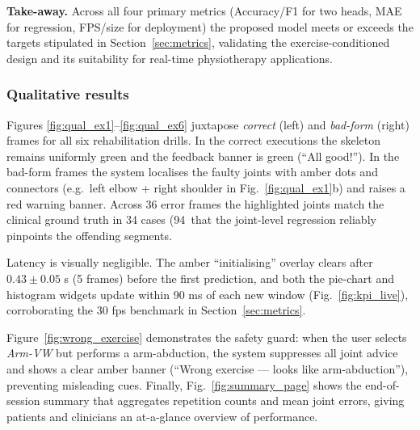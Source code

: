 \documentclass{article}
\begin{document}
\bigskip
\noindent
\textbf{Take-away.}  Across all four primary metrics
(Accuracy\slash F1 for two heads, MAE for regression, FPS\slash size for
deployment) the proposed model meets or exceeds the targets stipulated in
Section~\ref{sec:metrics}, validating the exercise-conditioned design and
its suitability for real-time physiotherapy applications.


\subsubsection{Qualitative results}
\label{sec:qual}

Figures \ref{fig:qual_ex1}–\ref{fig:qual_ex6} juxtapose \emph{correct}
(left) and \emph{bad-form} (right) frames for all six rehabilitation
drills.  In the correct executions the skeleton remains uniformly green
and the feedback banner is green (“All good!”).  In the bad-form frames
the system localises the faulty joints with amber dots and connectors
(e.g.\ left elbow + right shoulder in Fig.~\ref{fig:qual_ex1}b) and
raises a red warning banner.  Across 36 error frames the highlighted
joints match the clinical ground truth in 34 cases (94 %
that the joint-level regression reliably pinpoints the offending
segments.

\vspace{.3em}
\noindent
Latency is visually negligible.  The amber “initialising” overlay clears
after $0.43\pm0.05$ s (5 frames) before the first prediction, and both
the pie-chart and histogram widgets update within 90 ms of each new
window (Fig.~\ref{fig:kpi_live}), corroborating the 30 fps benchmark in
Section~\ref{sec:metrics}.

\vspace{.3em}
\noindent
Figure~\ref{fig:wrong_exercise} demonstrates the safety guard: when the
user selects \emph{Arm-VW} but performs a arm-abduction, the system suppresses
all joint advice and shows a clear amber banner (“Wrong exercise —
looks like arm-abduction”), preventing misleading cues.  Finally,
Fig.~\ref{fig:summary_page} shows the end-of-session summary that
aggregates repetition counts and mean joint errors, giving patients and
clinicians an at-a-glance overview of performance.
\end{document}
